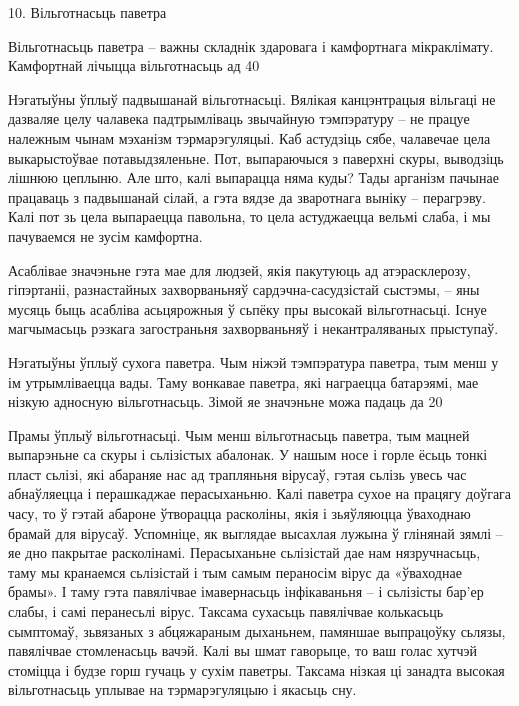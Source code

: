 10. Вільготнасьць паветра

Вільготнасьць паветра – важны складнік здаровага і камфортнага мікраклімату. Камфортнай лічыцца вільготнасьць ад 40%

Нэгатыўны ўплыў падвышанай вільготнасьці. Вялікая канцэнтрацыя вільгаці не дазваляе целу чалавека падтрымліваць звычайную тэмпэратуру – не працуе належным чынам мэханізм тэрмарэгуляцыі. Каб астудзіць сябе, чалавечае цела выкарыстоўвае потавыдзяленьне. Пот, выпараючыся з паверхні скуры, выводзіць лішнюю цеплыню. Але што, калі выпарацца няма куды? Тады арганізм пачынае працаваць з падвышанай сілай, а гэта вядзе да зваротнага выніку – перагрэву. Калі пот зь цела выпараецца павольна, то цела астуджаецца вельмі слаба, і мы пачуваемся не зусім камфортна.

Асаблівае значэньне гэта мае для людзей, якія пакутуюць ад атэрасклерозу, гіпэртаніі, разнастайных захворваньняў сардэчна-сасудзістай сыстэмы, – яны мусяць быць асабліва асьцярожныя ў сьпёку пры высокай вільготнасьці. Існуе магчымасьць рэзкага загостраньня захворваньняў і некантраляваных прыступаў.

Нэгатыўны ўплыў сухога паветра. Чым ніжэй тэмпэратура паветра, тым менш у ім утрымліваецца вады. Таму вонкавае паветра, які награецца батарэямі, мае нізкую адносную вільготнасьць. Зімой яе значэньне можа падаць да 20%

Прамы ўплыў вільготнасьці. Чым менш вільготнасьць паветра, тым мацней выпарэньне са скуры і сьлізістых абалонак. У нашым носе і горле ёсьць тонкі пласт сьлізі, які абараняе нас ад трапляньня вірусаў, гэтая сьлізь увесь час абнаўляецца і перашкаджае перасыханьню. Калі паветра сухое на працягу доўгага часу, то ў гэтай абароне ўтворацца расколіны, якія і зьяўляюцца ўваходнаю брамай для вірусаў. Успомніце, як выглядае высахлая лужына ў глінянай зямлі – яе дно пакрытае расколінамі. Перасыханьне сьлізістай дае нам нязручнасьць, таму мы кранаемся сьлізістай і тым самым пераносім вірус да «ўваходнае брамы». І таму гэта павялічвае імавернасьць інфікаваньня – і сьлізісты бар'ер слабы, і самі перанесьлі вірус. Таксама сухасьць павялічвае колькасьць сымптомаў, зьвязаных з абцяжараным дыханьнем, памяншае выпрацоўку сьлязы, павялічвае стомленасьць вачэй. Калі вы шмат гаворыце, то ваш голас хутчэй стоміцца і будзе горш гучаць у сухім паветры. Таксама нізкая ці занадта высокая вільготнасьць уплывае на тэрмарэгуляцыю і якасьць сну.

